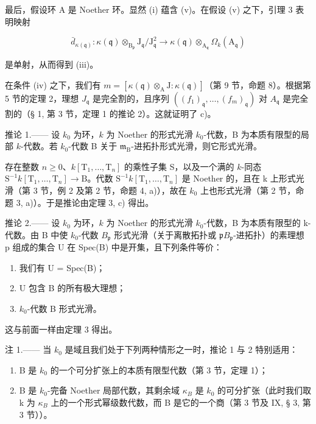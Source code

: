最后，假设环 A 是 Noether 环。显然 (i) 蕴含 (v)。在假设 (v) 之下，引理 3 表明映射

\[
\bar {d} _ {\kappa (\mathfrak {q})}: \kappa (\mathfrak {q}) \otimes_ {\mathrm{B} _ {\mathfrak {p}}} \mathrm{J} _ {\mathfrak {q}} / \mathrm{J} _ {\mathfrak {q}} ^ {2} \longrightarrow \kappa (\mathfrak {q}) \otimes_ {\mathrm{A} _ {\mathfrak {q}}} \Omega_ {k} (\mathrm{A} _ {\mathfrak {q}})
\]

是单射，从而得到 (iii)。

在条件 (iv) 之下，我们有 \(m=[\kappa(\mathfrak{q})\otimes_{\mathrm{A}}\mathrm{J}:\kappa(\mathfrak{q})]\)（第 9 节，命题 8）。根据第 5 节的定理 2，理想 \(J_{\mathfrak{q}}\) 是完全割的，且序列 \(((f_1)_{\mathfrak{q}},\ldots,(f_m)_{\mathfrak{q}})\) 对 \(A_{\mathfrak{q}}\) 是完全割的（§ 1, 第 3 节，定理 1 的推论 2）。这就证明了 c)。

推论 1.—— 设 \(k_{0}\) 为环，\(k\) 为 Noether 的形式光滑 \(k_{0}\)-代数，B 为本质有限型的局部 \(k\)-代数。若 \(k_{0}\)-代数 B 关于 \(\mathfrak{m}_{\mathrm{B}}\)-进拓扑形式光滑，则它形式光滑。

存在整数 \(n\geqslant 0\)、\(k[\mathrm{T}_{1},\ldots,\mathrm{T}_{n}]\) 的乘性子集 S，以及一个满的 \(k\)-同态 \(\mathrm{S}^{-1}k[\mathrm{T}_{1},\ldots,\mathrm{T}_{n}]\to\mathrm{B}\)。代数 \(\mathrm{S}^{-1}k[\mathrm{T}_{1},\ldots,\mathrm{T}_{n}]\) 是 Noether 的，且在 k 上形式光滑（第 3 节，例 2 及第 2 节，命题 4, a)），故在 \(k_{0}\) 上也形式光滑（第 2 节，命题 3, a)）。于是推论由定理 3, c) 得出。

推论 2.—— 设 \(k_{0}\) 为环，\(k\) 为 Noether 的形式光滑 \(k_{0}\)-代数，B 为本质有限型的 k-代数。由 B 中使 \(k_{0}\)-代数 \(B_{\mathfrak{p}}\) 形式光滑（关于离散拓扑或 \(\mathfrak{p}B_{\mathfrak{p}}\)-进拓扑）的素理想 p 组成的集合 U 在 Spec(B) 中是开集，且下列条件等价：

\begin{enumerate}
\def\labelenumi{(\roman{enumi})}
\item
  我们有 U = Spec(B)；
\item
  U 包含 B 的所有极大理想；
\item
  \(k_{0}\)-代数 B 形式光滑。
\end{enumerate}

这与前面一样由定理 3 得出。

注 1.—— 当 \(k_{0}\) 是域且我们处于下列两种情形之一时，推论 1 与 2 特别适用：

\begin{enumerate}
\def\labelenumi{\alph{enumi})}
\item
  B 是 \(k_{0}\) 的一个可分扩张上的本质有限型代数（第 3 节，定理 1）；
\item
  B 是 \(k_{0}\)-完备 Noether 局部代数，其剩余域 \(\kappa_{B}\) 是 \(k_{0}\) 的可分扩张（此时我们取 k 为 \(\kappa_{B}\) 上的一个形式幂级数代数，而 B 是它的一个商（第 3 节及 IX, § 3, 第 3 节））。
\end{enumerate}

